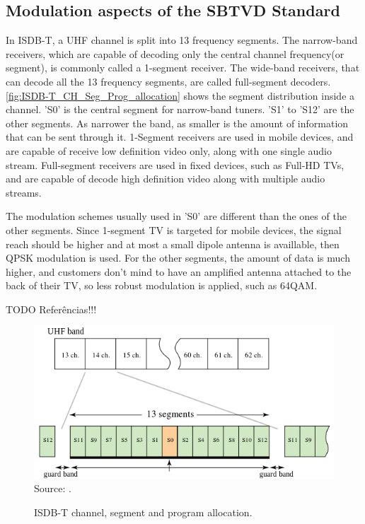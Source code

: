\documentclass[
	12pt,				%
	openright,			%
	twoside,			%
	a4paper,			%
	brazil,
	french,				%
	english
	]{abntex2}
\begin{document}
%
%


\begin{apendicesenv}

\partapendices

\chapter{Modulation aspects of the SBTVD Standard}
\label{modulation}
In ISDB-T, a UHF channel is split into 13 frequency segments. The narrow-band receivers, which are capable of decoding only the central channel frequency(or segment), is commonly called a 1-segment receiver. The wide-band receivers, that can decode all the 13 frequency segments, are called full-segment decoders. \autoref{fig:ISDB-T_CH_Seg_Prog_allocation} shows the segment distribution inside a channel. 'S0' is the central segment for narrow-band tuners. 'S1' to 'S12' are the other segments. As narrower the band, as smaller is the amount of information that can be sent through it. 1-Segment receivers are used in mobile devices, and are capable of receive low definition video only, along with one single audio stream. Full-segment receivers are used in fixed devices, such as Full-HD TVs, and are capable of decode high definition video along with multiple audio streams.

The modulation schemes usually used in 'S0' are different than the ones of the other segments. Since 1-segment TV is targeted for mobile devices, the signal reach should be higher and at most a small dipole antenna is availlable, then QPSK modulation is used. For the other segments, the amount of data is much higher, and customers don't mind to have an amplified antenna attached to the back of their TV, so less robust modulation is applied, such as 64QAM. 

TODO Referências!!!

\begin{figure}
\centering
\caption{ISDB-T channel, segment and program allocation.}
\includegraphics[width=0.6\linewidth]{figuras/ISDB-T_CH_Seg_Prog_allocation.png}
\\Source: .
\label{fig:ISDB-T_CH_Seg_Prog_allocation}
\end{figure}


\end{apendicesenv}
\end{document}
